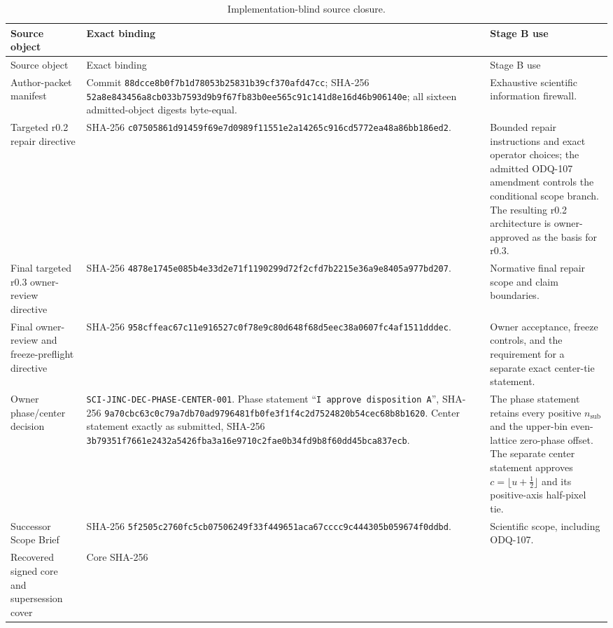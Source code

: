\documentclass[11pt]{article}
\newcommand{\Digest}[2]{\texttt{#1}\allowbreak\texttt{#2}}
\begin{document}
\begin{longtable}{@{}>{\raggedright\arraybackslash}p{}
                        >{\raggedright\arraybackslash}p{}
                        >{\raggedright\arraybackslash}p{}@{}}
\caption{Implementation-blind source closure.}\label{tab:source-closure}\\
\toprule
Source object & Exact binding & Stage B use \\
\midrule
\endfirsthead
\toprule
Source object & Exact binding & Stage B use \\
\midrule
\endhead
Author-packet manifest & Commit
\Digest{88dcce8b0f7b1d78053b2}{5831b39cf370afd47cc}; SHA-256
\Digest{52a8e843456a8cb033b7593d9b9f67f}{b83b0ee565c91c141d8e16d46b906140e};
all sixteen admitted-object digests byte-equal. & Exhaustive scientific
information firewall. \\
Targeted r0.2 repair directive & SHA-256
\Digest{c07505861d91459f69e7d0989f11551e}{2a14265c916cd5772ea48a86bb186ed2}.
& Bounded repair instructions and exact operator choices; the admitted
ODQ-107 amendment controls the conditional scope branch.  The resulting r0.2
architecture is owner-approved as the basis for r0.3. \\
Final targeted r0.3 owner-review directive & SHA-256
\Digest{4878e1745e085b4e33d2e71f1190299}{d72f2cfd7b2215e36a9e8405a977bd207}.
& Normative final repair scope and claim boundaries. \\
Final owner-review and freeze-preflight directive & SHA-256
\Digest{958cffeac67c11e916527c0f78e9c80d}{648f68d5eec38a0607fc4af1511dddec}.
& Owner acceptance, freeze controls, and the requirement for a separate exact
center-tie statement. \\
Owner phase/center decision &
\texttt{SCI-JINC-DEC-PHASE-CENTER-001}.  Phase statement
``\texttt{I approve disposition A}'', SHA-256
\Digest{9a70cbc63c0c79a7db70ad9796481fb0}{fe3f1f4c2d7524820b54cec68b8b1620}.
Center statement exactly as submitted, SHA-256
\Digest{3b79351f7661e2432a5426fba3a16e9}{710c2fae0b34fd9b8f60dd45bca837ecb}.
& The phase statement retains every positive $n_{\mathrm{sub}}$ and the
upper-bin even-lattice zero-phase offset.  The separate center statement
approves $c=\lfloor u+\tfrac12\rfloor$ and its positive-axis half-pixel tie. \\
Successor Scope Brief & SHA-256
\Digest{5f2505c2760fc5cb07506249f33f4496}{51aca67cccc9c444305b059674f0ddbd}.
& Scientific scope, including ODQ-107. \\
Recovered signed core and supersession cover & Core SHA-256

\end{longtable}
\end{document}
